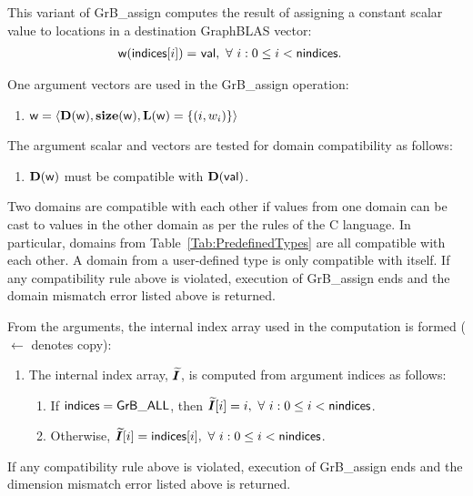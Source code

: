 This variant of {\sf GrB\_assign} computes the result of assigning a constant
scalar value to locations in a destination GraphBLAS vector: 
\[
\begin{aligned}
	{\sf w}({\sf indices}[i]) = &\ {\sf val}, \ 
    \forall \  i : 0 \leq i < {\sf nindices}.
\end{aligned}
\]  

One argument vectors are used in the {\sf GrB\_assign} operation:
\begin{enumerate}
	\item ${\sf w} = \langle \bold{D}({\sf w}),\bold{size}({\sf w}),
    \bold{L}({\sf w}) = \{(i,w_i) \} \rangle$
\end{enumerate}

The argument scalar and vectors
are tested for domain compatibility as follows:
\begin{enumerate}
	\item $\bold{D}({\sf w})$ must be compatible with $\bold{D}({\sf val})$.
\end{enumerate}
Two domains are compatible with each other if values from one domain can be cast 
to values in the other domain as per the rules of the C language.
In particular, domains from Table~\ref{Tab:PredefinedTypes} are all compatible 
with each other. A domain from a user-defined type is only compatible with itself.
If any compatibility rule above is violated, execution of {\sf GrB\_assign} ends
and the domain mismatch error listed above is returned.

From the arguments, the internal index array used in 
the computation is formed ($\leftarrow$ denotes copy):
\begin{enumerate}
    \item The internal index array, $\bm{\widetilde{I}}$, is computed from 
    argument {\sf indices} as follows:
	\begin{enumerate}
		\item	If ${\sf indices} = {\sf GrB\_ALL}$, then 
        $\bm{\widetilde{I}}[i] = i, \ \forall \ i : 0 \leq i < {\sf nindices}$.

		\item	Otherwise, $\bm{\widetilde{I}}[i] = {\sf indices}[i], 
        \ \forall \ i : 0 \leq i < {\sf nindices}$.
    \end{enumerate}
\end{enumerate}

If any compatibility rule above is violated, execution of {\sf GrB\_assign} ends and 
the dimension mismatch error listed above is returned.

